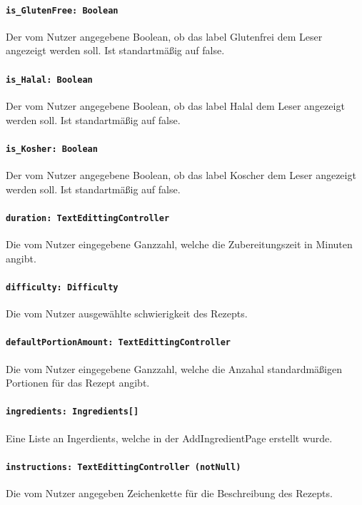 \documentclass{entwurfsheft}
\begin{document}
            \paragraph*{\texttt{is\_GlutenFree: Boolean}} Der vom Nutzer angegebene Boolean, ob das \gls{label} Glutenfrei dem Leser angezeigt werden soll. Ist standartmäßig auf false.
            \paragraph*{\texttt{is\_Halal: Boolean}} Der vom Nutzer angegebene Boolean, ob das \gls{label} Halal dem Leser angezeigt werden soll. Ist standartmäßig auf false.
            \paragraph*{\texttt{is\_Kosher: Boolean}} Der vom Nutzer angegebene Boolean, ob das \gls{label} Koscher dem Leser angezeigt werden soll. Ist standartmäßig auf false.
            \paragraph*{\texttt{duration: TextEdittingController}} Die vom Nutzer eingegebene Ganzzahl, welche die Zubereitungszeit in Minuten angibt.
            \paragraph*{\texttt{difficulty: Difficulty}} Die vom Nutzer ausgewählte \gls{schwierigkeit} des Rezepts. 
            \paragraph*{\texttt{defaultPortionAmount: TextEdittingController}} Die vom Nutzer eingegebene Ganzzahl, welche die Anzahal standardmäßigen Portionen für das Rezept angibt.
            \paragraph*{\texttt{ingredients: Ingredients[]}} Eine Liste an Ingerdients, welche in der AddIngredientPage erstellt wurde.
            \paragraph*{\texttt{instructions: TextEdittingController (notNull)}} Die vom Nutzer angegeben Zeichenkette für die Beschreibung des Rezepts.
\end{document}
